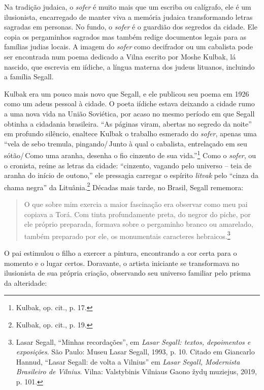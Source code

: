 Na tradição judaica, o \textit{sofer}
é muito mais que um escriba ou calígrafo, ele é um ilusionista,
encarregado de manter viva a memória judaica transformando letras
sagradas em personas. No fundo, o \textit{sofer} é o guardião dos segredos da
cidade. Ele copia os pergaminhos sagrados mas também redige documentos
legais para as famílias judias locais. A imagem do \textit{sofer} como 
decifrador ou um cabalista pode ser encontrada num poema dedicado a Vilna escrito por Moshe Kulbak,
lá nascido, que escrevia em iídiche, a língua materna dos judeus
lituanos, incluindo a família Segall. 

Kulbak era um pouco mais novo que
Segall, e ele publicou seu poema em 1926 como um adeus pessoal à cidade.
O poeta iídiche estava deixando a cidade rumo a uma nova vida na União
Soviética, por acaso no mesmo período em que Segall obtinha a cidadania
brasileira. ``As páginas viram, abertas no segredo da noite'' em
profundo silêncio, enaltece Kulbak o trabalho esmerado do \textit{sofer}, apenas
uma ``vela de sebo tremula, pingando/\,Junto à qual o cabalista,
entrelaçado em seu sótão/\,Como uma aranha, desenha o fio cinzento de
sua vida.''\footnote{Kulbak, op. cit., p. 17.} Como o \textit{sofer}, ou o cronista, reúne
as letras da cidade: ``cinzento, vagando pelo universo -- teia de aranha
do início de outono,'' ele pressagia carregar o espírito \textit{litvak} pelo
``cinza da chama negra'' da Lituânia.\footnote{Kulbak, op. cit., p. 19.}
Décadas mais tarde, no Brasil, Segall rememora: 

\begin{quote}
O que sobre mim
exercia a maior fascinação era observar como meu pai copiava a Torá. Com
tinta profundamente preta, do negror do piche, por ele próprio
preparada, formava sobre o pergaminho branco ou amarelado, também
preparado por ele, os monumentais caracteres hebraicos.\footnote{Lasar Segall, ``Minhas recordações'', em \textit{Lasar Segall: textos, depoimentos
  e exposições}. São Paulo: Museu Lasar Segall, 1993, p. 10. Citado em
  Giancarlo Hannud, ``Lasar Segall: de volta a Vilnius'' em \textit{Lasar
  Segall, Modernista Brasileiro de Vilnius}. Vilna: Valstybinis
  Vilniaus Gaono žydų muziejus, 2019, p. 101.} 
\end{quote}

O pai estimulou o filho a
exercer a pintura, encontrando a cor certa para o momento e o lugar
certos. Doravante, o artista iniciante se transformava no ilusionista de
sua própria criação, observando seu universo familiar pelo prisma da
alteridade:

